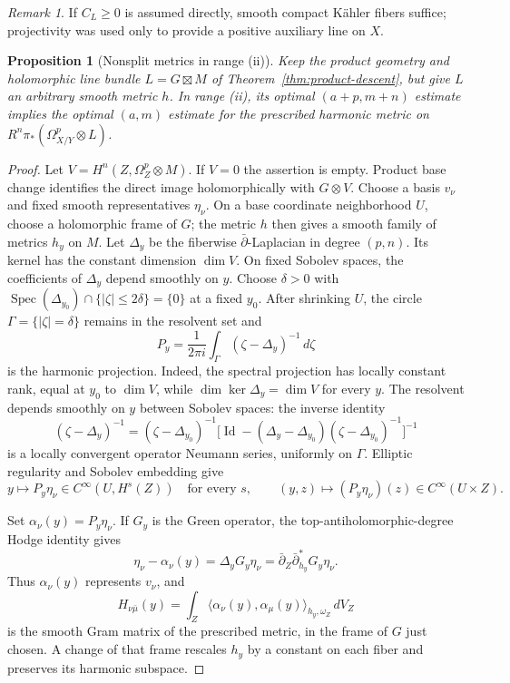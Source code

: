 \documentclass[11pt,reqno]{amsart}
\numberwithin{equation}{section}
\newtheorem{proposition}[theorem]{Proposition}
\theoremstyle{definition}
\theoremstyle{remark}
\newtheorem{remark}[theorem]{Remark}
\newcommand{\Id}{\operatorname{Id}}
\begin{document}
\begin{remark}\label{rem:product-attribution}
If $C_L\ge0$ is assumed directly, smooth compact
K\"ahler fibers suffice; projectivity was used only to provide a
positive auxiliary line on $X$.
\end{remark}

\begin{proposition}[Nonsplit metrics in range (ii)]\label{thm:variable-metric}
Keep the product geometry and holomorphic line bundle
$L=G\boxtimes M$ of Theorem~\ref{thm:product-descent}, but give $L$
an arbitrary smooth metric $h$.  In range (ii), its optimal
$(a+p,m+n)$ estimate implies the optimal $(a,m)$ estimate for the
prescribed harmonic metric on $R^n\pi_*(\Omega_{X/Y}^p\otimes L)$.
\end{proposition}
\begin{proof}
Let $V=H^n(Z,\Omega_Z^p\otimes M)$.  If $V=0$ the assertion is
empty.  Product base change identifies the direct image
holomorphically with $G\otimes V$.  Choose a basis $v_\nu$ and fixed smooth
representatives $\eta_\nu$.  On a base coordinate neighborhood
$U$, choose a holomorphic frame of $G$; the metric $h$ then gives
a smooth family of metrics $h_y$ on $M$.
Let $\Delta_y$ be the fiberwise $\bar\partial$-Laplacian in degree
$(p,n)$.  Its kernel has the constant dimension $\dim V$.
On fixed Sobolev spaces, the coefficients of $\Delta_y$ depend
smoothly on $y$.  Choose $\delta>0$ with
$\operatorname{Spec}(\Delta_{y_0})\cap\{|\zeta|\le2\delta\}=\{0\}$
at a fixed $y_0$.  After shrinking $U$, the circle
$\Gamma=\{|\zeta|=\delta\}$ remains in the resolvent set and
\[
 P_y=\frac1{2\pi i}\int_\Gamma(\zeta-\Delta_y)^{-1}\,d\zeta
\]
is the harmonic projection.  Indeed, the spectral projection has
locally constant rank, equal at $y_0$ to $\dim V$, while
$\dim\ker\Delta_y=\dim V$ for every $y$.
The resolvent depends smoothly on $y$ between Sobolev spaces:
the inverse identity
\[
 (\zeta-\Delta_y)^{-1}
 =(\zeta-\Delta_{y_0})^{-1}
 \bigl[\Id-(\Delta_y-\Delta_{y_0})
                   (\zeta-\Delta_{y_0})^{-1}\bigr]^{-1}
\]
is a locally convergent operator Neumann series, uniformly on
$\Gamma$.  Elliptic regularity and Sobolev embedding give
\[
 y\longmapsto P_y\eta_\nu\in C^\infty(U,H^s(Z))
 \quad\text{for every }s,\qquad
 (y,z)\longmapsto(P_y\eta_\nu)(z)\in C^\infty(U\times Z).
\]

Set $\alpha_\nu(y)=P_y\eta_\nu$.  If $G_y$ is the Green operator,
the top-antiholomorphic-degree Hodge identity gives
\[
 \eta_\nu-\alpha_\nu(y)
   =\Delta_yG_y\eta_\nu
   =\bar\partial_Z\bar\partial_{h_y}^*G_y\eta_\nu .
\]
Thus $\alpha_\nu(y)$ represents $v_\nu$, and
\[
 H_{\nu\bar\mu}(y)
   =\int_Z\langle\alpha_\nu(y),\alpha_\mu(y)\rangle_{h_y,\omega_Z}
                  \,dV_Z
\]
is the smooth Gram matrix of the prescribed metric, in the frame
of $G$ just chosen.  A change of that frame rescales $h_y$ by a
constant on each fiber and preserves its harmonic subspace.


\end{proof}
\end{document}
